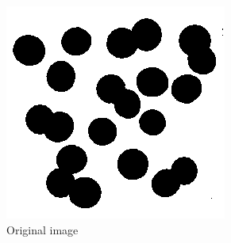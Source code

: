 \begin{figure}[H]
	\centering
		\includegraphics[scale=0.5]{images/bloodBW.png}
		\caption{Original image}
		\label{fig:bloodBW}
\end{figure}

